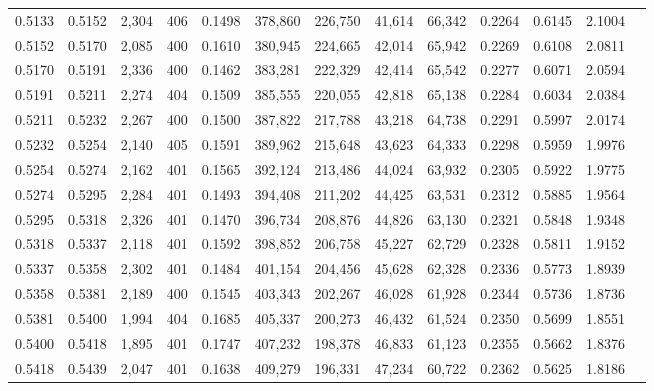 \begin{tabular}{rrrrrrrrrrrrr}
0.5133 & 0.5152 & 2,304 & 406 &                                     0.1498 & 378,860 & 226,750 &  41,614 &  66,342 & 0.2264 & 0.6145 & 2.1004 \\
0.5152 & 0.5170 & 2,085 & 400 &                                     0.1610 & 380,945 & 224,665 &  42,014 &  65,942 & 0.2269 & 0.6108 & 2.0811 \\
0.5170 & 0.5191 & 2,336 & 400 &                                     0.1462 & 383,281 & 222,329 &  42,414 &  65,542 & 0.2277 & 0.6071 & 2.0594 \\
0.5191 & 0.5211 & 2,274 & 404 &                                     0.1509 & 385,555 & 220,055 &  42,818 &  65,138 & 0.2284 & 0.6034 & 2.0384 \\
0.5211 & 0.5232 & 2,267 & 400 &                                     0.1500 & 387,822 & 217,788 &  43,218 &  64,738 & 0.2291 & 0.5997 & 2.0174 \\
0.5232 & 0.5254 & 2,140 & 405 &                                     0.1591 & 389,962 & 215,648 &  43,623 &  64,333 & 0.2298 & 0.5959 & 1.9976 \\
0.5254 & 0.5274 & 2,162 & 401 &                                     0.1565 & 392,124 & 213,486 &  44,024 &  63,932 & 0.2305 & 0.5922 & 1.9775 \\
0.5274 & 0.5295 & 2,284 & 401 &                                     0.1493 & 394,408 & 211,202 &  44,425 &  63,531 & 0.2312 & 0.5885 & 1.9564 \\
0.5295 & 0.5318 & 2,326 & 401 &                                     0.1470 & 396,734 & 208,876 &  44,826 &  63,130 & 0.2321 & 0.5848 & 1.9348 \\
0.5318 & 0.5337 & 2,118 & 401 &                                     0.1592 & 398,852 & 206,758 &  45,227 &  62,729 & 0.2328 & 0.5811 & 1.9152 \\
0.5337 & 0.5358 & 2,302 & 401 &                                     0.1484 & 401,154 & 204,456 &  45,628 &  62,328 & 0.2336 & 0.5773 & 1.8939 \\
0.5358 & 0.5381 & 2,189 & 400 &                                     0.1545 & 403,343 & 202,267 &  46,028 &  61,928 & 0.2344 & 0.5736 & 1.8736 \\
0.5381 & 0.5400 & 1,994 & 404 &                                     0.1685 & 405,337 & 200,273 &  46,432 &  61,524 & 0.2350 & 0.5699 & 1.8551 \\
0.5400 & 0.5418 & 1,895 & 401 &                                     0.1747 & 407,232 & 198,378 &  46,833 &  61,123 & 0.2355 & 0.5662 & 1.8376 \\
0.5418 & 0.5439 & 2,047 & 401 &                                     0.1638 & 409,279 & 196,331 &  47,234 &  60,722 & 0.2362 & 0.5625 & 1.8186 \\

\end{tabular}
